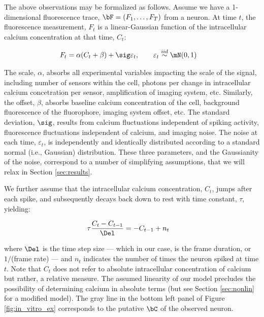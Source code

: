 The above observations may be formalized as follows. Assume we have a 1-dimensional fluorescence trace, $\bF=(F_1, \ldots, F_T)$ from a neuron.  At time $t$, the fluorescence measurement, $F_t$ is a linear-Gaussian function of the intracellular calcium concentration at that time, $C_t$:

\begin{align} \label{eq:F}
F_t &= \alpha (C_t + \beta) + \sig \varepsilon_t, \qquad \varepsilon_t \overset{iid}{\sim} \mN(0,1)
\end{align}

\noindent The scale, $\alpha$, absorbs all experimental variables impacting the scale of the signal, including number of sensors within the cell, photons per change in intracellular calcium concetration per sensor, amplification of imaging system, etc.  Similarly, the offset, $\beta$, absorbs baseline calcium concentration of the cell, background fluorescence of the fluorophore, imaging system offset, etc.  The standard deviation, $\sig$, results from calcium fluctuations independent of spiking activity, fluorescence fluctuations independent of calcium, and imaging noise. The noise at each time, $\varepsilon_t$, is independently and identically distributed according to a standard normal (i.e., Gaussian) distribution.  These three parameters, and the Gaussianity of the noise,  correspond to a number of simplifying assumptions, that we will relax in Section \ref{sec:results}.  

We further assume that the intracellular calcium concentration, $C_t$, jumps after each spike, and subsequently decays back down to rest with time constant, $\tau$, yielding:


\begin{align} \label{eq:C}
\tau \frac{C_t - C_{t-1}}{\Del} &= - C_{t-1} + n_t
\end{align}

\noindent where $\Del$ is the time step size --- which in our case, is the frame duration, or $1/$(frame rate) --- and $n_t$ indicates the number of times the neuron spiked at time $t$. %
Note that $C_t$ does not refer to absolute intracellular concentration of calcium but rather, a relative measure.  The assumed linearity of our model precludes the possibility of determining calcium in absolute terms (but see Section \ref{sec:nonlin} for a modified model).  The gray line in the bottom left panel of Figure \ref{fig:in_vitro_ex} corresponds to the putative $\bC$ of the observed neuron.  

